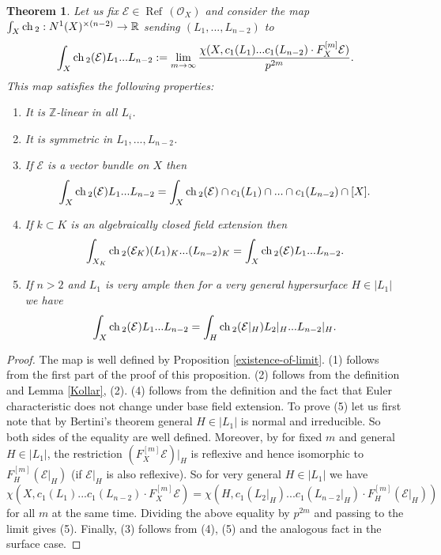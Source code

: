 \documentclass[twoside, 11pt]{article}
\theoremstyle{plain}
\newtheorem{Theorem}[Thm]{\sc Theorem}
\theoremstyle{definition}
\theoremstyle{remark}
\newcommand{\ZZ}{{\mathbb Z}}
\newcommand{\RR}{{\mathbb R}}
\newcommand{\cE}{{\mathcal E}}
\newcommand{\cO}{{\mathcal O}}
\newcommand{\Refl}{{\mathop{\operatorname{Ref}\, }}}
\newcommand{\ch}{{\mathop{\rm ch \, }}}
\begin{document}
\begin{Theorem}\label{properties-of-ch_2}
Let us fix $\cE\in \Refl(\cO _X)$ and
consider the map $\int_X\ch_2 : N^1( X) ^{\times (n-2)}\to \RR$ sending
$(L_1,..., L_{n-2})$ to 
$$\int _X \ch _2 (\cE)L_1...L_{n-2}:=
\lim _{m\to \infty }\frac {  \chi (X, c_1(L_1)...c_1(L_{n-2}) \cdot {F_X^{[m]}\cE}  ) }{p^{2m}}.$$
This map satisfies the following properties:
\begin{enumerate}
\item It is $\ZZ$-linear in all $L_i$.
\item It is symmetric in $L_1,...,L_{n-2}$.
\item If $\cE$ is a vector bundle on $X$ then $$\int _X \ch _2 (\cE)L_1...L_{n-2}=\int_X \ch _2 (\cE)\cap c_1(L_1)\cap ...\cap c_1(L_{n-2}) \cap [X].$$
\item If $k\subset K$ is an algebraically closed field extension then 
$$\int _{X_K} \ch _2 (\cE_K)(L_1)_K...(L_{n-2})_K=\int _X \ch _2 (\cE)L_1...L_{n-2}.$$
\item If $n>2$ and  $ L_1$ is very ample then for a very general hypersurface $H\in |L_1|$ we have
$$\int _X \ch _2 (\cE)L_1...L_{n-2}=\int _{H}\ch_2 (\cE|_{H})L_2|_{H}...L_{n-2}|_{H}.$$
\end{enumerate}
\end{Theorem}

\begin{proof}
The map is well defined by Proposition \ref{existence-of-limit}. (1) follows from the first part of the proof of this proposition. (2) follows from the definition and Lemma \ref{Kollar}, (2). (4) follows from the definition and the fact that Euler characteristic does not change under base field extension.
To prove (5) let us first note that by Bertini's theorem  general $H\in |L_1|$ is normal and irreducible. So both sides of the equality are well defined. Moreover, by \cite[Corollary 1.1.14]{HL} 
for fixed $m$ and general $H\in |L_1|$, the restriction $(F_X^{[m]}\cE)|_{H}$ is reflexive and hence isomorphic to ${F_{H}^{[m]}(\cE |_{H})}$ (if $\cE|_H$ is also reflexive). So for very general $H\in |L_1|$ we have
$$\chi (X, c_1(L_1)...c_1(L_{n-2}) \cdot {F_X^{[m]}\cE}  )  =\chi (H, c_1(L_2|_{H})...c_1(L_{n-2}|_{H}) \cdot {F_{H}^{[m]}(\cE |_{H})}  ) $$
for all $m$ at the same time.  Dividing the above equality by $p^{2m}$ and passing to the limit gives (5).
Finally, (3) follows from (4), (5) and the analogous fact in the surface case.
\end{proof}

\medskip
\end{document}
